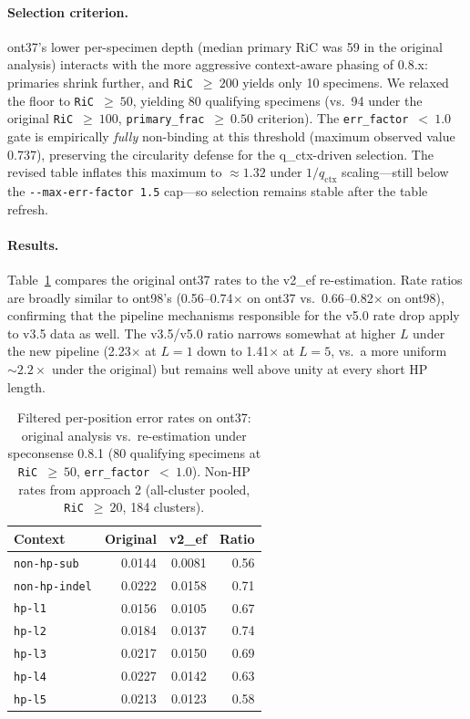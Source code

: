\documentclass[11pt]{article}
\begin{document}
\paragraph{Selection criterion.} ont37's lower per-specimen depth (median
primary RiC was 59 in the original analysis) interacts with the more
aggressive context-aware phasing of 0.8.x: primaries shrink further, and
\texttt{RiC}~$\geq~200$ yields only 10 specimens. We relaxed the floor to
\texttt{RiC}~$\geq~50$, yielding 80 qualifying specimens (vs.\ 94 under the
original \texttt{RiC}~$\geq~100$, \texttt{primary\_frac}~$\geq~0.50$
criterion). The \texttt{err\_factor}~$<~1.0$ gate is empirically
\emph{fully} non-binding at this threshold (maximum observed value 0.737),
preserving the circularity defense for the q\_ctx-driven selection. The
revised table inflates this maximum to $\approx 1.32$ under
$1/q_\text{ctx}$ scaling---still below the \texttt{-{}-max-err-factor~1.5}
cap---so selection remains stable after the table refresh.

\paragraph{Results.} Table~\ref{tab:reestimation_ont37} compares the
original ont37 rates to the v2\_ef re-estimation. Rate ratios are broadly
similar to ont98's (0.56--0.74$\times$ on ont37 vs.\ 0.66--0.82$\times$ on
ont98), confirming that the pipeline mechanisms responsible for the v5.0
rate drop apply to v3.5 data as well. The v3.5/v5.0 ratio narrows somewhat
at higher $L$ under the new pipeline (2.23$\times$ at $L=1$ down to
1.41$\times$ at $L=5$, vs.\ a more uniform $\sim 2.2\times$ under the
original) but remains well above unity at every short HP length.

\begin{table}[h]
\centering
\caption{Filtered per-position error rates on ont37: original analysis vs.\
re-estimation under speconsense 0.8.1 (80 qualifying specimens at
\texttt{RiC}~$\geq~50$, \texttt{err\_factor}~$<~1.0$). Non-HP rates from
approach 2 (all-cluster pooled, \texttt{RiC}~$\geq~20$, 184 clusters).}
\label{tab:reestimation_ont37}
\begin{tabular}{lrrr}
\toprule
Context & Original & v2\_ef & Ratio \\
\midrule
\texttt{non-hp-sub}   & 0.0144 & 0.0081 & 0.56 \\
\texttt{non-hp-indel} & 0.0222 & 0.0158 & 0.71 \\
\midrule
\texttt{hp-l1}        & 0.0156 & 0.0105 & 0.67 \\
\texttt{hp-l2}        & 0.0184 & 0.0137 & 0.74 \\
\texttt{hp-l3}        & 0.0217 & 0.0150 & 0.69 \\
\texttt{hp-l4}        & 0.0227 & 0.0142 & 0.63 \\
\texttt{hp-l5}        & 0.0213 & 0.0123 & 0.58 \\
\bottomrule
\end{tabular}
\end{table}
\end{document}
